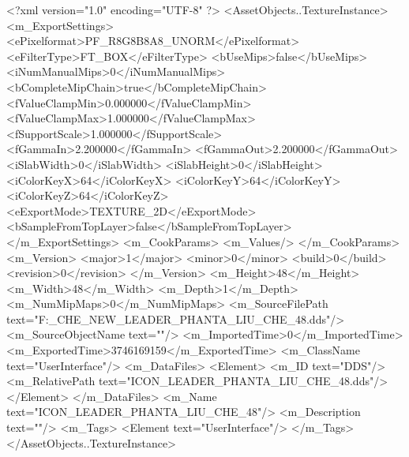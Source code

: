 <?xml version="1.0" encoding="UTF-8" ?>
<AssetObjects..TextureInstance>
	<m_ExportSettings>
		<ePixelformat>PF_R8G8B8A8_UNORM</ePixelformat>
		<eFilterType>FT_BOX</eFilterType>
		<bUseMips>false</bUseMips>
		<iNumManualMips>0</iNumManualMips>
		<bCompleteMipChain>true</bCompleteMipChain>
		<fValueClampMin>0.000000</fValueClampMin>
		<fValueClampMax>1.000000</fValueClampMax>
		<fSupportScale>1.000000</fSupportScale>
		<fGammaIn>2.200000</fGammaIn>
		<fGammaOut>2.200000</fGammaOut>
		<iSlabWidth>0</iSlabWidth>
		<iSlabHeight>0</iSlabHeight>
		<iColorKeyX>64</iColorKeyX>
		<iColorKeyY>64</iColorKeyY>
		<iColorKeyZ>64</iColorKeyZ>
		<eExportMode>TEXTURE_2D</eExportMode>
		<bSampleFromTopLayer>false</bSampleFromTopLayer>
	</m_ExportSettings>
	<m_CookParams>
		<m_Values/>
	</m_CookParams>
	<m_Version>
		<major>1</major>
		<minor>0</minor>
		<build>0</build>
		<revision>0</revision>
	</m_Version>
	<m_Height>48</m_Height>
	<m_Width>48</m_Width>
	<m_Depth>1</m_Depth>
	<m_NumMipMaps>0</m_NumMipMaps>
	<m_SourceFilePath text="F:\MOD\TEMPLATE\LIU_CHE_NEW\ICON_LEADER_PHANTA_LIU_CHE_48.dds"/>
	<m_SourceObjectName text=""/>
	<m_ImportedTime>0</m_ImportedTime>
	<m_ExportedTime>3746169159</m_ExportedTime>
	<m_ClassName text="UserInterface"/>
	<m_DataFiles>
		<Element>
			<m_ID text="DDS"/>
			<m_RelativePath text="ICON_LEADER_PHANTA_LIU_CHE_48.dds"/>
		</Element>
	</m_DataFiles>
	<m_Name text="ICON_LEADER_PHANTA_LIU_CHE_48"/>
	<m_Description text=""/>
	<m_Tags>
		<Element text="UserInterface"/>
	</m_Tags>
</AssetObjects..TextureInstance>

